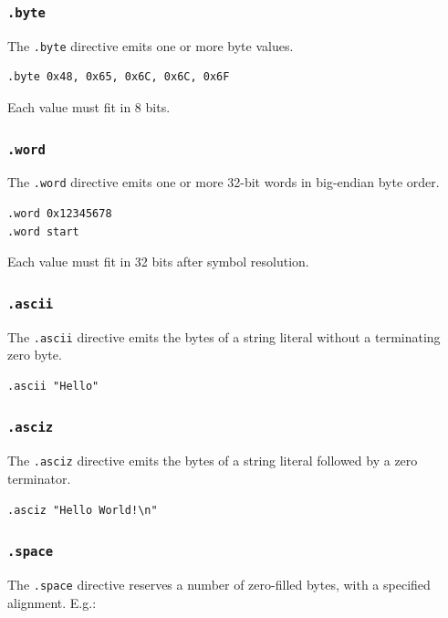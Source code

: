 \subsubsection{\texttt{.byte}}

The \texttt{.byte} directive emits one or more byte values.

\begin{verbatim}
.byte 0x48, 0x65, 0x6C, 0x6C, 0x6F
\end{verbatim}

Each value must fit in 8 bits.

\subsubsection{\texttt{.word}}

The \texttt{.word} directive emits one or more 32-bit words in big-endian byte order.

\begin{verbatim}
.word 0x12345678
.word start
\end{verbatim}

Each value must fit in 32 bits after symbol resolution.

\subsubsection{\texttt{.ascii}}

The \texttt{.ascii} directive emits the bytes of a string literal without a terminating
zero byte.

\begin{verbatim}
.ascii "Hello"
\end{verbatim}

\subsubsection{\texttt{.asciz}}

The \texttt{.asciz} directive emits the bytes of a string literal followed by a zero
terminator.

\begin{verbatim}
.asciz "Hello World!\n"
\end{verbatim}

\subsubsection{\texttt{.space}}

The \texttt{.space} directive reserves a number of zero-filled bytes, with a
specified alignment. E.g.:

